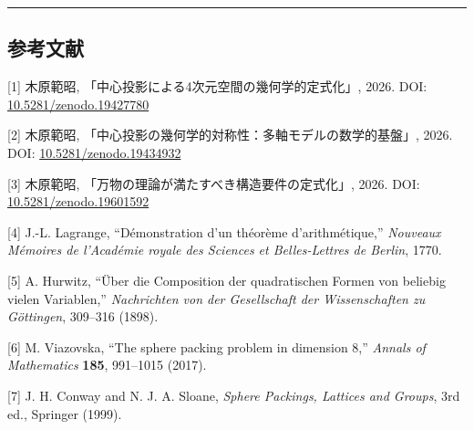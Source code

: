 \documentclass[a4paper,11pt]{ltjsarticle}
\begin{document}
\begin{center}\rule{0.5\linewidth}{0.5pt}\end{center}

\subsection{参考文献}\label{ux53c2ux8003ux6587ux732e}

{[}1{]} 木原範昭, 「中心投影による4次元空間の幾何学的定式化」, 2026.
DOI:
\href{https://doi.org/10.5281/zenodo.19427780}{10.5281/zenodo.19427780}

{[}2{]} 木原範昭, 「中心投影の幾何学的対称性：多軸モデルの数学的基盤」,
2026. DOI:
\href{https://doi.org/10.5281/zenodo.19434932}{10.5281/zenodo.19434932}

{[}3{]} 木原範昭, 「万物の理論が満たすべき構造要件の定式化」, 2026. DOI:
\href{https://doi.org/10.5281/zenodo.19601592}{10.5281/zenodo.19601592}

{[}4{]} J.-L. Lagrange, ``Démonstration d'un théorème d'arithmétique,''
\emph{Nouveaux Mémoires de l'Académie royale des Sciences et
Belles-Lettres de Berlin}, 1770.

{[}5{]} A. Hurwitz, ``Über die Composition der quadratischen Formen von
beliebig vielen Variablen,'' \emph{Nachrichten von der Gesellschaft der
Wissenschaften zu Göttingen}, 309--316 (1898).

{[}6{]} M. Viazovska, ``The sphere packing problem in dimension 8,''
\emph{Annals of Mathematics} \textbf{185}, 991--1015 (2017).

{[}7{]} J. H. Conway and N. J. A. Sloane, \emph{Sphere Packings,
Lattices and Groups}, 3rd ed., Springer (1999).
\end{document}
